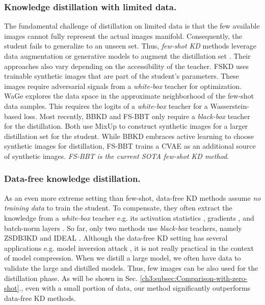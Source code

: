 \subsubsection{Knowledge distillation with limited data.}
\begin{foldable}
    The fundamental challenge of distillation on limited data is that the few available images cannot fully represent the actual images manifold.
    Consequently, the student fails to generalize to an unseen set.
    Thus, \textit{few-shot KD} methods leverage data augmentation or generative models to augment the distillation set \cite{kimura2018fewshot,kong2020learning,wang2020neural,nguyen2022black}.
    Their approaches also vary depending on the accessibility of the teacher.
    FSKD \cite{kimura2018fewshot} uses trainable synthetic images that are part of the student's parameters.
    These images require adversarial signals from a \textit{white-box} teacher for optimization.
    WaGe \cite{kong2020learning} explores the data space in the approximate neighborhood of the few-shot data samples.
    This requires the logits of a \textit{white-box} teacher for a Wasserstein-based loss.
    Most recently, BBKD \cite{wang2020neural} and FS-BBT \cite{nguyen2022black} only require a \textit{black-box} teacher for the distillation.
    Both use MixUp to construct synthetic images for a larger distillation set for the student.
    While BBKD embraces active learning to choose synthetic images for distillation, FS-BBT trains a CVAE as an additional source of synthetic images.
    \textit{FS-BBT is the current SOTA few-shot KD method}.
\end{foldable}

\subsubsection{Data-free knowledge distillation.}
\begin{foldable}
    As an even more extreme setting than few-shot, data-free KD methods assume \textit{no training data} to train the student.
    To compensate, they often extract the knowledge from a \textit{white-box} teacher e.g. its activation statistics \cite{lopes2017data}, gradients \cite{nayak2019zero,chen2019data}, and batch-norm layers \cite{yin2020dreaming}.
    So far, only two methods use \textit{black-box} teachers, namely ZSDB3KD \cite{wang2021zero} and IDEAL \cite{zhang2022ideal}.
    Although the data-free KD setting has several applications e.g. model inversion attack \cite{zhang2020secret}, it is not really practical in the context of model compression.
    When we distill a large model, we often have data to validate the large and distilled models.
    Thus, few images can be also used for the distillation phase.
    As will be shown in Sec. \ref{ch3:subsec:Comparison-with-zero-shot}., even with a small portion of data, our method significantly outperforms data-free KD methods.
\end{foldable}

